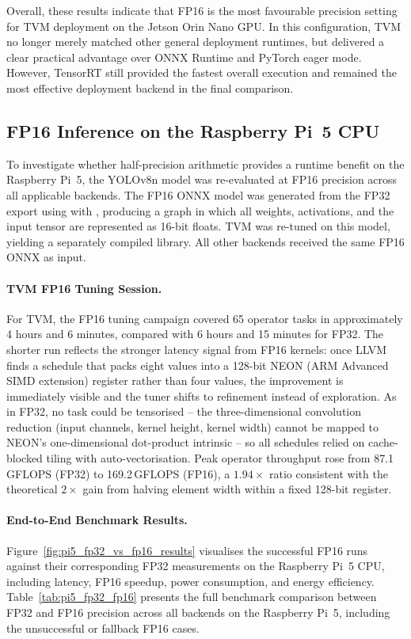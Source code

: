 \documentclass[12pt,a4paper]{report}
\begin{document}
Overall, these results indicate that FP16 is the most favourable precision
setting for TVM deployment on the Jetson Orin Nano GPU. In this configuration,
TVM no longer merely matched other general deployment runtimes, but delivered a
clear practical advantage over ONNX Runtime and PyTorch eager mode. However,
TensorRT still provided the fastest overall execution and remained the most
effective deployment backend in the final comparison.

\subsection{FP16 Inference on the Raspberry Pi~5 CPU}

To investigate whether half-precision arithmetic provides a runtime benefit on
the Raspberry Pi~5, the YOLOv8n model was re-evaluated at FP16 precision across
all applicable backends. The FP16 ONNX model was generated from the FP32 export
using  with , producing
a graph in which all weights, activations, and the input tensor are represented
as 16-bit floats. TVM was re-tuned on this model, yielding a separately compiled
 library. All other backends received the same FP16 ONNX as input.

\paragraph{TVM FP16 Tuning Session.}
For TVM, the FP16 tuning campaign covered 65 operator tasks in approximately 4 hours and 6 minutes,
compared with 6 hours and 15 minutes for FP32.
The shorter run reflects the stronger latency signal from FP16 kernels: once LLVM finds a schedule that
packs eight  values into a 128-bit NEON (ARM Advanced SIMD extension) register rather than
four  values, the improvement is immediately visible and the tuner shifts to refinement
instead of exploration.
As in FP32, no task could be tensorised -- the three-dimensional convolution reduction (input channels,
kernel height, kernel width) cannot be mapped to NEON's one-dimensional dot-product intrinsic -- so all
schedules relied on cache-blocked tiling with  auto-vectorisation.
Peak operator throughput rose from 87.1\,GFLOPS (FP32) to 169.2\,GFLOPS (FP16), a \(1.94\times\) ratio
consistent with the theoretical $2\times$ gain from halving element width within a fixed 128-bit register.

\paragraph{End-to-End Benchmark Results.}
Figure~\ref{fig:pi5_fp32_vs_fp16_results} visualises the successful FP16 runs
against their corresponding FP32 measurements on the Raspberry Pi~5 CPU,
including latency, FP16 speedup, power consumption, and energy efficiency.
Table~\ref{tab:pi5_fp32_fp16} presents the full benchmark comparison between
FP32 and FP16 precision across all backends on the Raspberry Pi~5, including
the unsuccessful or fallback FP16 cases.
\end{document}
